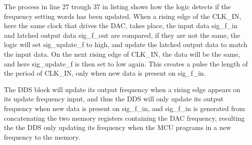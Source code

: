     The process in line 27 trough 37 in listing  shows how the logic detects if the frequency setting words has been updated. When a rising edge of the CLK\_IN, here the same clock that drives the DAC, takes place, the input data sig\_f\_in and latched output data sig\_f\_out are compared, if they are not the same, the logic will set sig\_update\_f to high, and update the latched output data to match the input data. On the next rising edge of CLK\_IN, the data will be the same, and here sig\_update\_f is then set to low again. This creates a pulse the length of the period of CLK\_IN, only when new data is present on sig\_f\_in. 
    
    The DDS block will update its output frequency when a rising edge appears on its update frequency input, and thus the DDS will only update its output frequency when new data is present on sig\_f\_in, and sig\_f\_in is generated from concatenating the two memory registers containing the DAC frequency, resulting the the DDS only updating its frequency when the MCU programs in a new frequency to the memory.